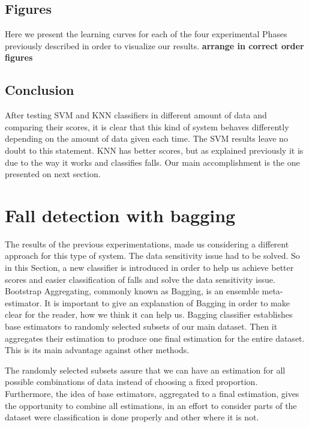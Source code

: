 \documentclass[10pt, conference, compsocconf]{IEEEtran}
\begin{document}
\subsection{Figures}

Here we present the learning curves for each of the four experimental Phases previously described in order to visualize our results. 
{\bf arrange in correct order figures}


\subsection{Conclusion}

After testing SVM and KNN classifiers in different amount of data and comparing their scores, it is clear that this kind of system behaves differently depending on the amount of data given each time. The SVM results leave no doubt to this statement. KNN has better scores, but as explained previously it is due to the way it works and classifies falls. Our main accomplishment is the one presented on next section.

\section{Fall detection with bagging} \label{BaggingFall}
 

The results of the previous experimentations, made us considering a different approach for this type of system. The data sensitivity issue had to be solved. So in this Section, a new classifier is introduced in order to help us achieve better scores and easier classification of falls and solve the data sensitivity issue. Bootstrap Aggregating, commonly known as Bagging, is an ensemble meta-estimator. It is important to give an explanation of Bagging in order to make clear for the reader, how we think it can help us. Bagging classifier establishes base estimators to randomly selected subsets of our main dataset. Then it aggregates their estimation to produce one final estimation for the entire dataset. This is its main advantage against other methods. 

The randomly selected subsets assure that we can have an estimation for all possible combinations of data instead of choosing a fixed proportion. Furthermore, the idea of base estimators, aggregated to a final estimation, gives the opportunity to combine all estimations, in an effort to consider parts of the dataset were classification is done properly and other where it is not. 
\end{document}
